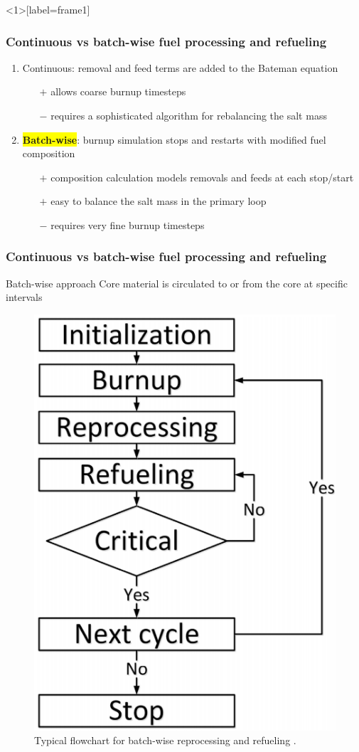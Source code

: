 \begin{frame}<1>[label=frame1]
\frametitle{Continuous vs batch-wise fuel processing  and refueling}

\begin{enumerate}
	\itemsep2em
	\item<1-> Continuous: removal and feed terms are added to the Bateman 
	equation
	\begin{itemize}
		\itemsep1em
		\item[$\mathbf{+}$] allows coarse burnup timesteps
		\item[$\mathbf{-}$] requires a sophisticated algorithm for rebalancing 
		the salt mass 
	\end{itemize}
	\item<3-> \colorbox{yellow}{\textbf{Batch-wise}}: burnup simulation stops 
	and restarts with 
	modified fuel composition
	\begin{itemize}
		\itemsep1em
		\item[$\mathbf{+}$] composition calculation models removals and feeds 
		at each stop/start
		\item[$\mathbf{+}$] easy to balance the salt mass in the primary loop
		\item[$\mathbf{-}$] requires very fine burnup timesteps
	\end{itemize}
\end{enumerate}

\end{frame}

\begin{frame}
\frametitle{Continuous vs batch-wise fuel processing and refueling}
\begin{block}{Batch-wise approach}
	Core material is circulated to or from the core at specific 
	intervals		
\end{block}
\begin{figure}[t]
	\hspace{3mm}
	\includegraphics[height=0.4\textwidth]{./images/batch-wise.png}
	\caption{Typical flowchart for batch-wise reprocessing and refueling 
		\cite{li_optimization_2018}.}
\end{figure}               
\end{frame}


